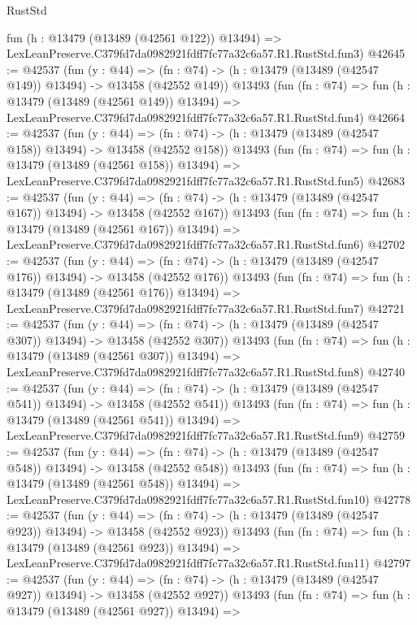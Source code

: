 \begin{lexlean}{RustStd}
\begin{coremodule}
    fun (h : @13479 (@13489 (@42561 @122)) @13494) =>
    LexLeanPreserve.C379fd7da0982921fdff7fc77a32c6a57.R1.RustStd.fun3)
@42645 := @42537
    (fun (y : @44) =>
    (fn : @74) -> (h : @13479 (@13489 (@42547 @149)) @13494) -> @13458 (@42552 @149))
    @13493
    (fun (fn : @74) =>
    fun (h : @13479 (@13489 (@42561 @149)) @13494) =>
    LexLeanPreserve.C379fd7da0982921fdff7fc77a32c6a57.R1.RustStd.fun4)
@42664 := @42537
    (fun (y : @44) =>
    (fn : @74) -> (h : @13479 (@13489 (@42547 @158)) @13494) -> @13458 (@42552 @158))
    @13493
    (fun (fn : @74) =>
    fun (h : @13479 (@13489 (@42561 @158)) @13494) =>
    LexLeanPreserve.C379fd7da0982921fdff7fc77a32c6a57.R1.RustStd.fun5)
@42683 := @42537
    (fun (y : @44) =>
    (fn : @74) -> (h : @13479 (@13489 (@42547 @167)) @13494) -> @13458 (@42552 @167))
    @13493
    (fun (fn : @74) =>
    fun (h : @13479 (@13489 (@42561 @167)) @13494) =>
    LexLeanPreserve.C379fd7da0982921fdff7fc77a32c6a57.R1.RustStd.fun6)
@42702 := @42537
    (fun (y : @44) =>
    (fn : @74) -> (h : @13479 (@13489 (@42547 @176)) @13494) -> @13458 (@42552 @176))
    @13493
    (fun (fn : @74) =>
    fun (h : @13479 (@13489 (@42561 @176)) @13494) =>
    LexLeanPreserve.C379fd7da0982921fdff7fc77a32c6a57.R1.RustStd.fun7)
@42721 := @42537
    (fun (y : @44) =>
    (fn : @74) -> (h : @13479 (@13489 (@42547 @307)) @13494) -> @13458 (@42552 @307))
    @13493
    (fun (fn : @74) =>
    fun (h : @13479 (@13489 (@42561 @307)) @13494) =>
    LexLeanPreserve.C379fd7da0982921fdff7fc77a32c6a57.R1.RustStd.fun8)
@42740 := @42537
    (fun (y : @44) =>
    (fn : @74) -> (h : @13479 (@13489 (@42547 @541)) @13494) -> @13458 (@42552 @541))
    @13493
    (fun (fn : @74) =>
    fun (h : @13479 (@13489 (@42561 @541)) @13494) =>
    LexLeanPreserve.C379fd7da0982921fdff7fc77a32c6a57.R1.RustStd.fun9)
@42759 := @42537
    (fun (y : @44) =>
    (fn : @74) -> (h : @13479 (@13489 (@42547 @548)) @13494) -> @13458 (@42552 @548))
    @13493
    (fun (fn : @74) =>
    fun (h : @13479 (@13489 (@42561 @548)) @13494) =>
    LexLeanPreserve.C379fd7da0982921fdff7fc77a32c6a57.R1.RustStd.fun10)
@42778 := @42537
    (fun (y : @44) =>
    (fn : @74) -> (h : @13479 (@13489 (@42547 @923)) @13494) -> @13458 (@42552 @923))
    @13493
    (fun (fn : @74) =>
    fun (h : @13479 (@13489 (@42561 @923)) @13494) =>
    LexLeanPreserve.C379fd7da0982921fdff7fc77a32c6a57.R1.RustStd.fun11)
@42797 := @42537
    (fun (y : @44) =>
    (fn : @74) -> (h : @13479 (@13489 (@42547 @927)) @13494) -> @13458 (@42552 @927))
    @13493
    (fun (fn : @74) =>
    fun (h : @13479 (@13489 (@42561 @927)) @13494) =>

\end{coremodule}
\end{lexlean}
